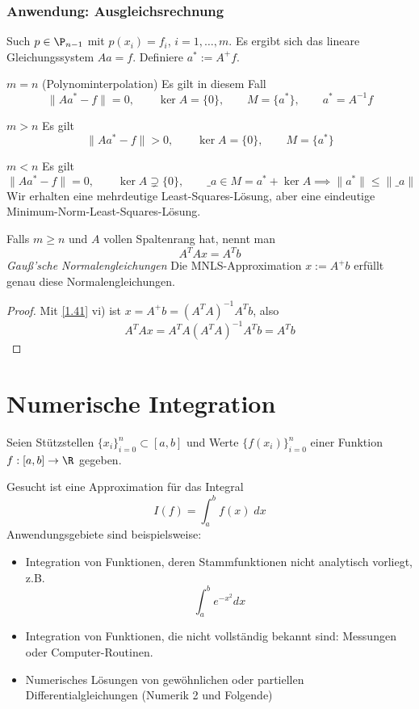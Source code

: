 \documentclass[11pt]{scrartcl}
\begin{document}
\subsubsection{Anwendung: Ausgleichsrechnung}

Such $p\in \P_{n-1}$ mit $p(x_i)=f_i$, $i=1,\dotsc,m$.
Es ergibt sich das lineare Gleichungssystem $Aa = f$.
Definiere $a^* := A^+f$.

\begin{seg}{$m=n$ (Polynominterpolation)}
	Es gilt in diesem Fall
	\[
		\|Aa^*-f\| = 0, \qquad \ker A = \{0\}, \qquad M = \{a^*\}, \qquad a^* = A^{-1}f
	\]
\end{seg}
\begin{seg}{$m>n$}
	Es gilt
	\[
		\|Aa^*-f\| > 0, \qquad \ker A = \{0\}, \qquad M = \{a^*\}
	\]
\end{seg}
\begin{seg}{$m<n$}
	Es gilt
	\[
		\|Aa^*-f\| = 0, \qquad \ker A \supsetneq \{0\}, \qquad \_a \in M = a^* + \ker A \implies \|a^*\| \le \|\_a\|
	\]
	Wir erhalten eine mehrdeutige Least-Squares-Lösung, aber eine eindeutige Minimum-Norm-Least-Squares-Lösung.
\end{seg}
\begin{nt*}
	Falls $m\ge n$ und $A$ vollen Spaltenrang hat, nennt man
	\[
		A^TAx = A^Tb
	\]
	\emph{Gauß'sche Normalengleichungen}
	Die MNLS-Approximation $x:=A^+b$ erfüllt genau diese Normalengleichungen.
	\begin{proof}
		Mit \ref{1.41} vi) ist $x=A^+b = (A^TA)^{-1}A^Tb$, also
		\[
			A^TAx = A^TA(A^TA)^{-1}A^T b = A^Tb
		\]
	\end{proof}
\end{nt*}



\section{Numerische Integration}	



Seien Stützstellen $\{x_i\}_{i=0}^n \subset [a,b]$ und Werte $\{f(x_i)\}_{i=0}^n$ einer Funktion $f:[a,b]\to \R$ gegeben.

Gesucht ist eine Approximation für das Integral
\[
	I(f) = \int_a^b f(x) \;dx
\]
Anwendungsgebiete sind beispielsweise:
\begin{itemize}
	\item
		Integration von Funktionen, deren Stammfunktionen nicht analytisch vorliegt, z.B.
		\[
			\int_a^b e^{-x^2} dx
		\]
	\item
		Integration von Funktionen, die nicht vollständig bekannt sind: Messungen oder Computer-Routinen.
	\item
		Numerisches Lösungen von gewöhnlichen oder partiellen Differentialgleichungen (Numerik 2 und Folgende)
\end{itemize}
\end{document}
